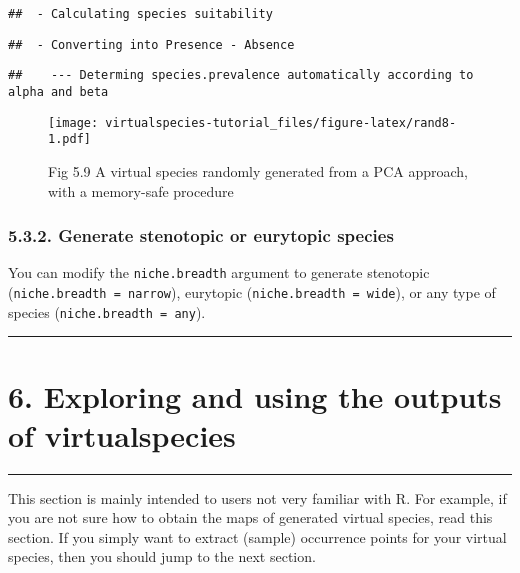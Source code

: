 \documentclass[]{article}
\begin{document}
\begin{verbatim}
##  - Calculating species suitability
\end{verbatim}

\begin{verbatim}
##  - Converting into Presence - Absence
\end{verbatim}

\begin{verbatim}
##    --- Determing species.prevalence automatically according to alpha and beta
\end{verbatim}

\begin{figure}
\centering
\texttt{[image: virtualspecies-tutorial\_files/figure-latex/rand8-1.pdf]}
\caption{Fig 5.9 A virtual species randomly generated from a PCA
approach, with a memory-safe procedure}
\end{figure}

\subsubsection{5.3.2. Generate stenotopic or eurytopic
species}\label{generate-stenotopic-or-eurytopic-species}

You can modify the \texttt{niche.breadth} argument to generate
stenotopic
(\texttt{niche.breadth\ =\ \textquotesingle{}narrow\textquotesingle{}}),
eurytopic
(\texttt{niche.breadth\ =\ \textquotesingle{}wide\textquotesingle{}}),
or any type of species
(\texttt{niche.breadth\ =\ \textquotesingle{}any\textquotesingle{}}).

\begin{center}\rule{0.5\linewidth}{\linethickness}\end{center}

\section{6. Exploring and using the outputs of
virtualspecies}\label{exploring-and-using-the-outputs-of-virtualspecies}

\begin{center}\rule{0.5\linewidth}{\linethickness}\end{center}

\setcounter{section}{6} \setcounter{figure}{0}

This section is mainly intended to users not very familiar with R. For
example, if you are not sure how to obtain the maps of generated virtual
species, read this section. If you simply want to extract (sample)
occurrence points for your virtual species, then you should jump to the
next section.
\end{document}
